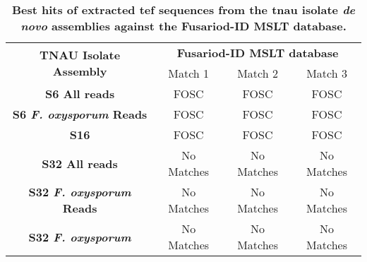 \begin{table}[]
\centering
\captionsetup{width=\linewidth} 
\caption[\Ac{tnau}\acf{tef} \acf{ncbi} and Fusariod-ID MSLT database searches.]{\textbf{Best hits of extracted \acf{tef} sequences from the \acf{tnau} isolate \textit{de novo} assemblies against the Fusariod-ID MSLT database.}}
\label{tab:Tef1-MLSTdb}
\begin{tabular}{cccc}
\multirow{2}{*}{\textbf{TNAU Isolate Assembly}} & \multicolumn{3}{c}{\textbf{Fusariod-ID MSLT database}}                                     \\ \cline{2-4} 
                                                & Match 1                      & Match 2                      & Match 3                      \\ \hline
\textbf{S6 All reads}                           & \ac{FOSC}& \ac{FOSC}& \ac{FOSC}\\
\textbf{S6 \textit{F. oxysporum}  Reads}                 & \ac{FOSC}& \ac{FOSC}& \ac{FOSC}\\
\textbf{S16}                                    & \ac{FOSC} & \ac{FOSC} & \ac{FOSC} \\
\textbf{S32 All reads}                          & No Matches                   & No Matches                   & No Matches                   \\
\textbf{S32 \textit{F. oxysporum}  Reads}                & No Matches                   & No Matches                   & No Matches                   \\
\textbf{S32 \textit{F. oxysporum}}                        & No Matches                   & No Matches                   & No Matches                  
\end{tabular}%
\end{table}
